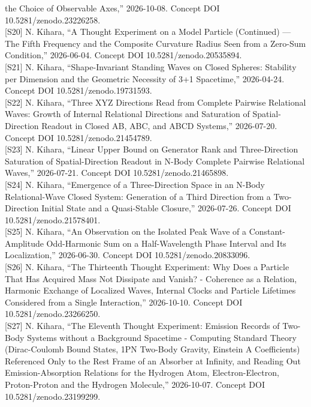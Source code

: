 \documentclass[
  a4paper,
]{article}
\begin{document}
the Choice of Observable Axes,'' 2026-10-08. Concept DOI
10.5281/zenodo.23226258.\\
{[}S20{]} N. Kihara, ``A Thought Experiment on a Model Particle
(Continued) --- The Fifth Frequency and the Composite Curvature Radius
Seen from a Zero-Sum Condition,'' 2026-06-04. Concept DOI
10.5281/zenodo.20535894.\\
{[}S21{]} N. Kihara, ``Shape-Invariant Standing Waves on Closed Spheres:
Stability per Dimension and the Geometric Necessity of 3+1 Spacetime,''
2026-04-24. Concept DOI 10.5281/zenodo.19731593.\\
{[}S22{]} N. Kihara, ``Three XYZ Directions Read from Complete Pairwise
Relational Waves: Growth of Internal Relational Directions and
Saturation of Spatial-Direction Readout in Closed AB, ABC, and ABCD
Systems,'' 2026-07-20. Concept DOI 10.5281/zenodo.21454789.\\
{[}S23{]} N. Kihara, ``Linear Upper Bound on Generator Rank and
Three-Direction Saturation of Spatial-Direction Readout in N-Body
Complete Pairwise Relational Waves,'' 2026-07-21. Concept DOI
10.5281/zenodo.21465898.\\
{[}S24{]} N. Kihara, ``Emergence of a Three-Direction Space in an N-Body
Relational-Wave Closed System: Generation of a Third Direction from a
Two-Direction Initial State and a Quasi-Stable Closure,'' 2026-07-26.
Concept DOI 10.5281/zenodo.21578401.\\
{[}S25{]} N. Kihara, ``An Observation on the Isolated Peak Wave of a
Constant-Amplitude Odd-Harmonic Sum on a Half-Wavelength Phase Interval
and Its Localization,'' 2026-06-30. Concept DOI
10.5281/zenodo.20833096.\\
{[}S26{]} N. Kihara, ``The Thirteenth Thought Experiment: Why Does a
Particle That Has Acquired Mass Not Dissipate and Vanish? - Coherence as
a Relation, Harmonic Exchange of Localized Waves, Internal Clocks and
Particle Lifetimes Considered from a Single Interaction,'' 2026-10-10.
Concept DOI 10.5281/zenodo.23266250.\\
{[}S27{]} N. Kihara, ``The Eleventh Thought Experiment: Emission Records
of Two-Body Systems without a Background Spacetime - Computing Standard
Theory (Dirac-Coulomb Bound States, 1PN Two-Body Gravity, Einstein A
Coefficients) Referenced Only to the Rest Frame of an Absorber at
Infinity, and Reading Out Emission-Absorption Relations for the Hydrogen
Atom, Electron-Electron, Proton-Proton and the Hydrogen Molecule,''
2026-10-07. Concept DOI 10.5281/zenodo.23199299.\\
\end{document}
